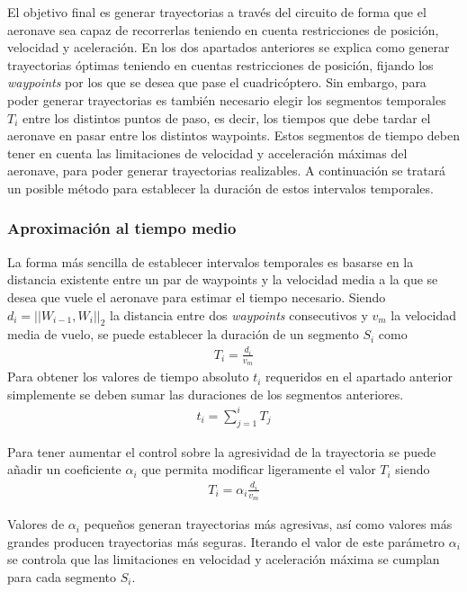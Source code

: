 El objetivo final es generar trayectorias a través del circuito de forma que el aeronave sea capaz de recorrerlas teniendo en cuenta restricciones de posición, velocidad y aceleración. En los dos apartados anteriores se explica como generar trayectorias óptimas teniendo en cuentas restricciones de posición, fijando los \textit{waypoints} por los que se desea que pase el cuadricóptero. Sin embargo, para poder generar trayectorias es también necesario elegir los segmentos temporales $T_i$ entre los distintos puntos de paso, es decir, los tiempos que debe tardar el aeronave en pasar entre los distintos waypoints. Estos segmentos de tiempo deben tener en cuenta las limitaciones de velocidad y acceleración máximas del aeronave, para poder generar trayectorias realizables. A continuación se tratará un posible método para establecer la duración de estos intervalos temporales.

\subsubsection{Aproximación al tiempo medio}

La forma más sencilla de establecer intervalos temporales es basarse en la distancia existente entre un par de waypoints y la velocidad media a la que se desea que vuele el aeronave para estimar el tiempo necesario. Siendo $d_i = || W_{i-1} , W_{i} ||_2 $ la distancia entre dos \textit{waypoints} consecutivos y $v_m$ la velocidad media de vuelo, se puede establecer la duración de un segmento $S_i$ como
\begin{align}
	T_i = \frac{d_i}{v_m}
\end{align}
Para obtener los valores de tiempo absoluto $t_i$ requeridos en el apartado anterior simplemente se deben sumar las duraciones de los segmentos anteriores.
\begin{align}
t_i = \sum_{j=1}^{i} T_j
\end{align}


Para tener aumentar el control sobre la agresividad de la trayectoria se puede añadir un coeficiente $\alpha_i$ que permita modificar ligeramente el valor $T_i$ siendo 
\begin{align}
	T_i = \alpha_i\frac{d_i}{v_m}
\end{align}

Valores de $\alpha_i$ pequeños generan trayectorias más agresivas, así como valores más grandes producen trayectorias más seguras. Iterando el valor de este parámetro $\alpha_i$ se controla que las limitaciones en velocidad y aceleración máxima se cumplan para cada segmento $S_i$.

